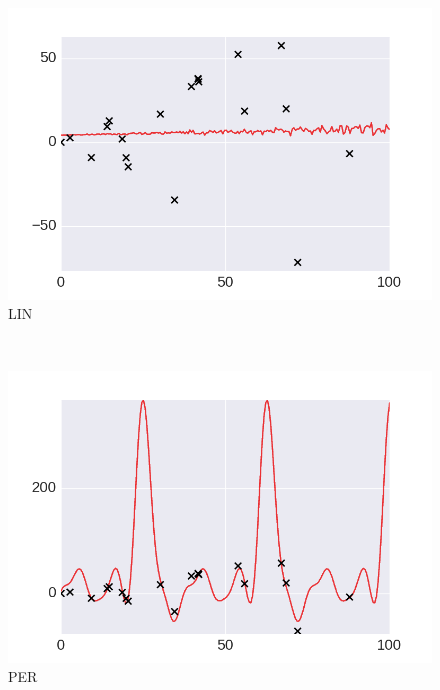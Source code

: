  \begin{subfigure}[b]{0.3\textwidth}
        \includegraphics[width=\textwidth]{figs/composition/composition_demo_LIN.png}
        \caption{LIN}
    \end{subfigure}
    ~ %
    \begin{subfigure}[b]{0.3\textwidth}
        \includegraphics[width=\textwidth]{figs/composition/composition_demo_PER.png}
        \caption{PER}
    \end{subfigure}
    ~ %

